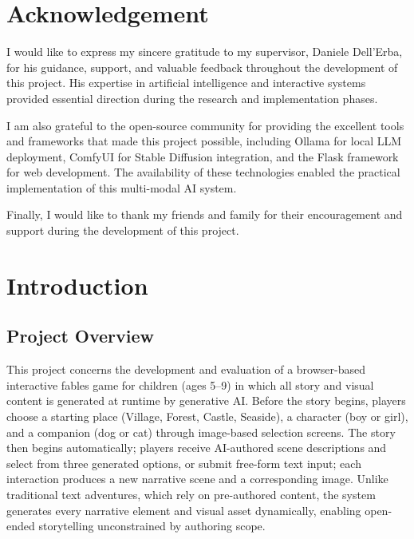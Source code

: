 \documentclass[12pt,a4paper]{article}
\begin{document}
    \newpage
    \section*{Acknowledgement}

    I would like to express my sincere gratitude to my supervisor, Daniele Dell'Erba, for his guidance, support, and valuable feedback throughout the development of this project. His expertise in artificial intelligence and interactive systems provided essential direction during the research and implementation phases.

    I am also grateful to the open-source community for providing the excellent tools and frameworks that made this project possible, including Ollama for local LLM deployment, ComfyUI for Stable Diffusion integration, and the Flask framework for web development. The availability of these technologies enabled the practical implementation of this multi-modal AI system.

    Finally, I would like to thank my friends and family for their encouragement and support during the development of this project.

    \newpage
    \tableofcontents
    \newpage
    \listoffigures
    \newpage
    \listoftables
    \newpage

    \section{Introduction}

    \subsection{Project Overview}

This project concerns the development and evaluation of a browser-based interactive fables game for children (ages 5--9) in which all story and visual content is generated at runtime by generative AI. Before the story begins, players choose a starting place (Village, Forest, Castle, Seaside), a character (boy or girl), and a companion (dog or cat) through image-based selection screens. The story then begins automatically; players receive AI-authored scene descriptions and select from three generated options, or submit free-form text input; each interaction produces a new narrative scene and a corresponding image. Unlike traditional text adventures, which rely on pre-authored content, the system generates every narrative element and visual asset dynamically, enabling open-ended storytelling unconstrained by authoring scope.
\end{document}
